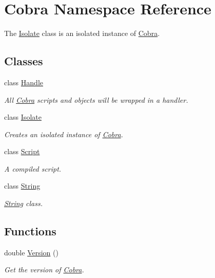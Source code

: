 \hypertarget{namespace_cobra}{\section{Cobra Namespace Reference}
\label{namespace_cobra}
}


The \hyperlink{class_cobra_1_1_isolate}{Isolate} class is an isolated instance of \hyperlink{namespace_cobra}{Cobra}.  


\subsection*{Classes}
\begin{DoxyCompactItemize}
\item 
class \hyperlink{class_cobra_1_1_handle}{Handle}
\begin{DoxyCompactList}\small\item\em All \hyperlink{namespace_cobra}{Cobra} scripts and objects will be wrapped in a handler. \end{DoxyCompactList}\item 
class \hyperlink{class_cobra_1_1_isolate}{Isolate}
\begin{DoxyCompactList}\small\item\em Creates an isolated instance of \hyperlink{namespace_cobra}{Cobra}. \end{DoxyCompactList}\item 
class \hyperlink{class_cobra_1_1_script}{Script}
\begin{DoxyCompactList}\small\item\em A compiled script. \end{DoxyCompactList}\item 
class \hyperlink{class_cobra_1_1_string}{String}
\begin{DoxyCompactList}\small\item\em \hyperlink{class_cobra_1_1_string}{String} class. \end{DoxyCompactList}\end{DoxyCompactItemize}
\subsection*{Functions}
\begin{DoxyCompactItemize}
\item 
double \hyperlink{namespace_cobra_a47f407730fdb699b15ddbca1e55826b6}{Version} ()
\begin{DoxyCompactList}\small\item\em Get the version of \hyperlink{namespace_cobra}{Cobra}. \end{DoxyCompactList}\end{DoxyCompactItemize}


